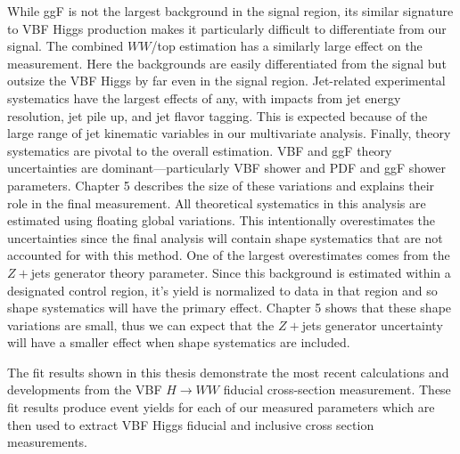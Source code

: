 While ggF is not the largest background in the signal region, its similar signature to VBF Higgs production makes it particularly difficult to differentiate from our signal. The combined $WW$/top estimation has a similarly large effect on the measurement. Here the backgrounds are easily differentiated from the signal but outsize the VBF Higgs by far even in the signal region. Jet-related experimental systematics have the largest effects of any, with impacts from jet energy resolution, jet pile up, and jet flavor tagging. This is expected because of the large range of jet kinematic variables in our multivariate analysis. Finally, theory systematics are pivotal to the overall estimation. VBF and ggF theory uncertainties are dominant---particularly VBF shower and PDF and ggF shower parameters. Chapter 5 describes the size of these variations and explains their role in the final measurement. All theoretical systematics in this analysis are estimated using floating global variations. This intentionally overestimates the uncertainties since the final analysis will contain shape systematics that are not accounted for with this method. One of the largest overestimates comes from the $Z+$jets generator theory parameter. Since this background is estimated within a designated control region, it's yield is normalized to data in that region and so shape systematics will have the primary effect. Chapter 5 shows that these shape variations are small, thus we can expect that the $Z+$jets generator uncertainty will have a smaller effect when shape systematics are included. 

The fit results shown in this thesis demonstrate the most recent calculations and developments from the VBF $H\rightarrow WW$ fiducial cross-section measurement. These fit results produce event yields for each of our measured parameters which are then used to extract VBF Higgs fiducial and inclusive cross section measurements.


